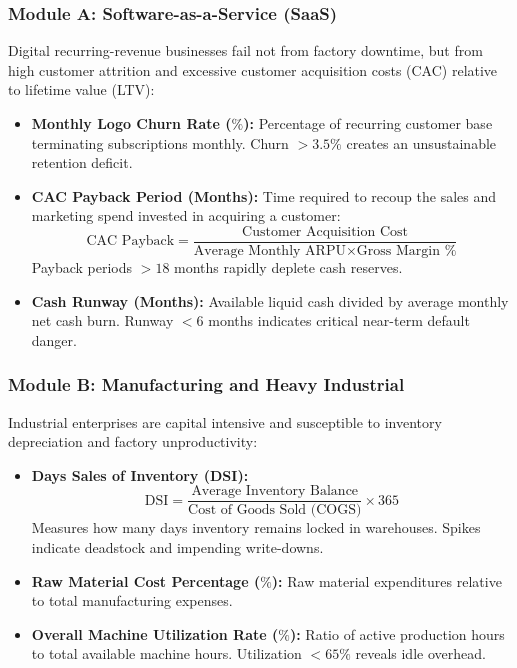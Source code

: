 \documentclass[11pt, a4paper]{article}
\begin{document}
\subsubsection{Module A: Software-as-a-Service (SaaS)}
Digital recurring-revenue businesses fail not from factory downtime, but from high customer attrition and excessive customer acquisition costs (CAC) relative to lifetime value (LTV):
\begin{itemize}
    \item \textbf{Monthly Logo Churn Rate ($\%$):} Percentage of recurring customer base terminating subscriptions monthly. Churn $> 3.5\%$ creates an unsustainable retention deficit.
    \item \textbf{CAC Payback Period (Months):} Time required to recoup the sales and marketing spend invested in acquiring a customer:
    \begin{equation}
        \text{CAC Payback} = \frac{\text{Customer Acquisition Cost}}{\text{Average Monthly ARPU} \times \text{Gross Margin \%}}
    \end{equation}
    Payback periods $> 18$ months rapidly deplete cash reserves.
    \item \textbf{Cash Runway (Months):} Available liquid cash divided by average monthly net cash burn. Runway $< 6$ months indicates critical near-term default danger.
\end{itemize}

\subsubsection{Module B: Manufacturing and Heavy Industrial}
Industrial enterprises are capital intensive and susceptible to inventory depreciation and factory unproductivity:
\begin{itemize}
    \item \textbf{Days Sales of Inventory (DSI):}
    \begin{equation}
        \text{DSI} = \frac{\text{Average Inventory Balance}}{\text{Cost of Goods Sold (COGS)}} \times 365
    \end{equation}
    Measures how many days inventory remains locked in warehouses. Spikes indicate deadstock and impending write-downs.
    \item \textbf{Raw Material Cost Percentage ($\%$):} Raw material expenditures relative to total manufacturing expenses.
    \item \textbf{Overall Machine Utilization Rate ($\%$):} Ratio of active production hours to total available machine hours. Utilization $< 65\%$ reveals idle overhead.
\end{itemize}
\end{document}
